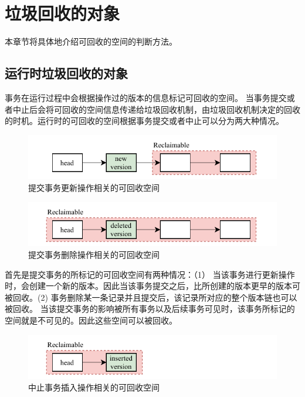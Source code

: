 \section{垃圾回收的对象}
\label{sec:space}

本章节将具体地介绍可回收的空间的判断方法。

\subsection{运行时垃圾回收的对象}

事务在运行过程中会根据操作过的版本的信息标记可回收的空间。
当事务提交或者中止后会将可回收的空间信息传递给垃圾回收机制，由垃圾回收机制决定的回收的时机。运行时的可回收的空间根据事务提交或者中止可以分为两大种情况。

\begin{figure}
    \centering
    \includegraphics[width=1\linewidth]{figures/gc-a.pdf}
    \caption{提交事务更新操作相关的可回收空间}
    \label{fig:space-commit}
\end{figure}

\begin{figure}
    \centering
    \includegraphics[width=1\linewidth]{figures/gc-b.pdf}
    \caption{提交事务删除操作相关的可回收空间}
    \label{fig:space-commit2}
\end{figure}

首先是提交事务的所标记的可回收空间有两种情况：（1） 当该事务进行更新操作时，会创建一个新的版本。因此当该事务提交之后，比所创建的版本更早的版本可被回收。(2) 事务删除某一条记录并且提交后，该记录所对应的整个版本链也可以被回收。 当该提交事务的影响被所有事务以及后续事务可见时，该事务所标记的空间就是不可见的。因此这些空间可以被回收。


\begin{figure}
    \centering
    \includegraphics[width=1\linewidth]{figures/gc-c.pdf}
    \caption{中止事务插入操作相关的可回收空间}
    \label{fig:space-abort}
\end{figure}

